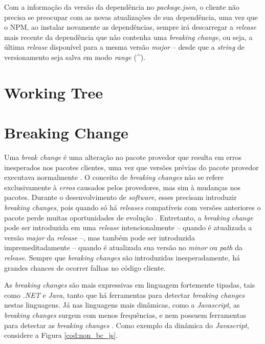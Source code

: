 Com a informação da versão da dependência no \textit{package.json}, o cliente não precisa se preocupar com as novas atualizações de sua dependência, uma vez que o \gls{NPM}, ao instalar novamente as dependências, sempre irá descarregar a \textit{release} mais recente da dependência que não contenha uma \textit{breaking change}, ou seja, a última \textit{release} disponível para a mesma versão \textit{major} -- desde que a \textit{string} de versionamento seja salva em modo \textit{range} (\textasciicircum).

\section{Working Tree}
\label{ref-teo:working_tree}

\section{Breaking Change}
\label{ref-teo:breaking_change}
Uma \textit{break change} é uma alteração no pacote provedor que resulta em erros inesperados nos pacotes clientes, uma vez que versões prévias do pacote provedor executava normalmente \cite{teorical_reference:semver}. O conceito de \textit{breaking changes} não se refere exclusivamente à \textit{erros} causados pelos provedores, mas sim à mudanças nos pacotes. Durante o desenvolvimento de \textit{software}, esses precisam introduzir \textit{breaking changes}, pois quando só há \textit{releases} compatíveis com versões anteriores o pacote perde muitas oportunidades de evolução \cite{teorical_reference:bc_2}. Entretanto, a \textit{breaking change} pode ser introduzida em uma \textit{release} intencionalmente -- quando é atualizada a versão \textit{major} da \textit{release} --, mas também pode ser introduzida impremeditadamente -- quando é atualizada sua versão no \textit{minor} ou \textit{path} da \textit{release}. Sempre que \textit{breaking changes} são introduzidas inesperadamente, há grandes chances de ocorrer falhas no código cliente.

As \textit{breaking changes} são mais expressivas em linguagem fortemente tipadas, tais como \textit{.NET} e \textit{Java}, tanto que há ferramentas para detectar \textit{breaking changes} nestas linguagens. Já nas linguagens mais dinâmicas, como a \textit{Javascript}, as \textit{breaking changes} surgem com menos frequências, e nem possuem ferramentas para detectar as \textit{breaking changes} \cite{teorical_reference:bc_1}. Como exemplo da dinâmica do \textit{Javascript}, considere a Figura \ref{cod:non_bc_js}.



